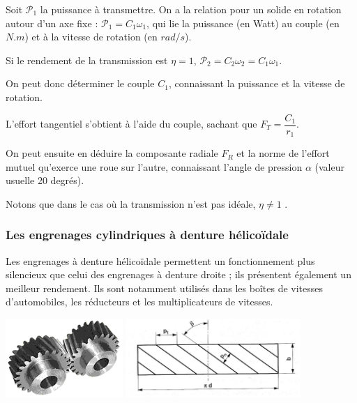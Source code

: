 \documentclass[11pt,oneside]{article}
\begin{document}
Soit $\mathcal{P}_1$ la puissance à transmettre. On a la relation pour un solide en rotation autour d’un axe fixe : $\mathcal{P}_1=C_1 \omega_1$, qui lie la puissance (en Watt) au couple (en $N.m$) et à la vitesse de rotation (en $rad/s$).

Si le rendement de la transmission est $\eta=1$, $\mathcal{P}_2 = C_2 \omega_2 = C_1 \omega_1$.

On peut donc déterminer le couple $C_1$, connaissant la puissance et la vitesse de rotation.

L’effort tangentiel s’obtient à l’aide du couple, sachant que  $F_T = \dfrac{C_1}{r_1}$.

On peut ensuite en déduire la composante radiale $F_R$ et la norme de l’effort mutuel qu’exerce une roue sur l’autre, connaissant l’angle de pression $\alpha$ (valeur usuelle 20 degrés).

Notons que dans le cas où la transmission n’est pas idéale, $\eta\neq 1$ .


\subsubsection{Les engrenages cylindriques à denture hélicoïdale}
Les engrenages à denture hélicoïdale permettent un fonctionnement plus silencieux que celui des engrenages à denture droite ; ils présentent également un meilleur rendement. Ils sont notamment utilisés dans les boîtes de vitesses d’automobiles, les réducteurs et les multiplicateurs de vitesses.

\begin{center}
\includegraphics[height=3cm]{png/fig_67}
\includegraphics[height=3cm]{png/fig_68}
\end{center}
\end{document}
